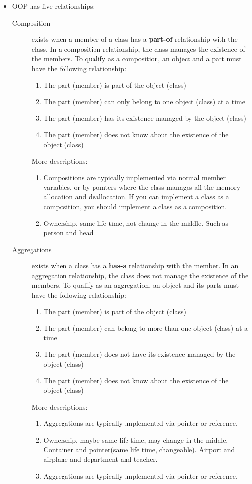 \documentclass[a4paper,11pt,twoside]{book}
\begin{document}
\begin{itemize}
	\item OOP has five relationships:
	\begin{description}
		\item[Composition ] exists when a member of a class has a \textbf{part-of} relationship with the class. In a composition relationship, the class manages the existence of the members. To qualify as a composition, an object and a part must have the following relationship:
		\begin{enumerate}
			\item The part (member) is part of the object (class)
			\item The part (member) can only belong to one object (class) at a time
			\item The part (member) has its existence managed by the object (class)
			\item The part (member) does not know about the existence of the object (class)
		\end{enumerate}
	More descriptions: 
	\begin{enumerate}
		\item Compositions are typically implemented via normal member variables, or by pointers where the class manages all the memory allocation and deallocation. If you can implement a class as a composition, you should implement a class as a composition.
		\item  Ownership, same life time,  not change in the middle. Such as person and head.
	\end{enumerate}
	
	
	\item[Aggregations ] exists when a class has a \textbf{has-a} relationship with the member. In an aggregation relationship, the class does not manage the existence of the members. To qualify as an aggregation, an object and its parts must have the following relationship:
	
	\begin{enumerate}
		\item The part (member) is part of the object (class)
		\item The part (member) can belong to more than one object (class) at a time
		\item The part (member) does not have its existence managed by the object (class)
		\item The part (member) does not know about the existence of the object (class)
	\end{enumerate}
	More descriptions: 
	\begin{enumerate}
		\item Aggregations are typically implemented via pointer or reference.
		\item Ownership, maybe same life time, may change in the middle,  Container and pointer(same life time, changeable). Airport and airplane and department and teacher.
        \item Aggregations are typically implemented via pointer or reference.
	\end{enumerate}
	

\end{description}
\end{itemize}
\end{document}
